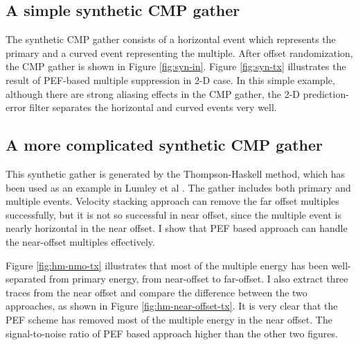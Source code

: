 \subsection{A simple synthetic CMP gather}

The synthetic CMP gather consists of a horizontal event which represents 
the primary and a curved event representing the multiple. After offset 
randomization, the CMP gather is shown in Figure \ref{fig:syn-in}. Figure 
\ref{fig:syn-tx} illustrates the result of PEF-based multiple suppression in 
2-D case. In this simple example, although there are strong aliasing effects 
in the CMP gather, the 2-D prediction-error filter separates the horizontal 
and curved events very well.


\subsection{A more complicated synthetic CMP gather}

This synthetic gather is generated by the Thompson-Haskell method, which 
has been used as an example in Lumley et al .
The gather includes both primary and multiple events. Velocity stacking 
approach can remove the far offset multiples successfully, but it is not 
so successful in near offset, since the multiple event is nearly horizontal 
in the near offset. I show that PEF based approach can handle the near-offset 
multiples effectively.

Figure \ref{fig:hm-nmo-tx} illustrates that most of the 
multiple energy has been well-separated from primary energy, from near-offset 
to far-offset. I also extract three traces from the near offset and compare 
the difference between the two approaches, as shown in Figure 
\ref{fig:hm-near-offset-tx}. 
It is very clear that the PEF scheme has removed most of the multiple energy 
in the near offset. The signal-to-noise ratio of PEF based approach higher 
than the other two figures.



